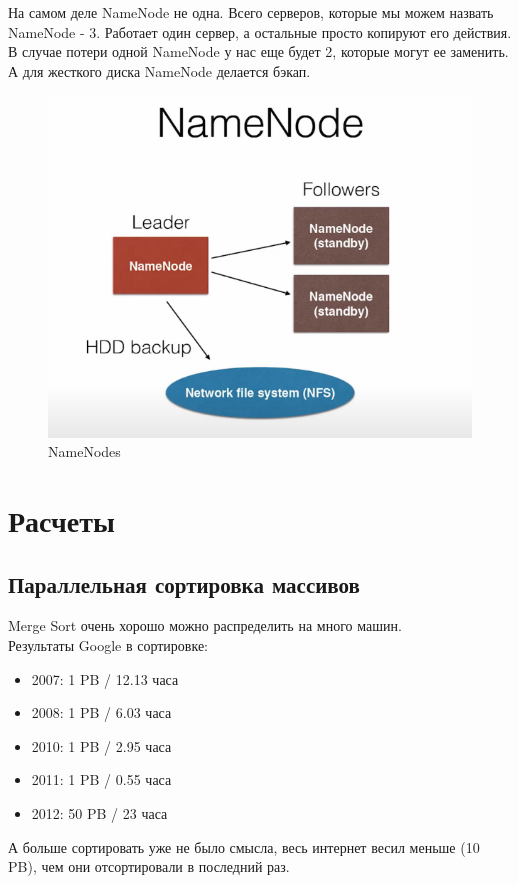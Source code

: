 \documentclass{article}
\begin{document}
На самом деле NameNode не одна. Всего серверов, которые мы можем назвать NameNode - 3. Работает один сервер, а остальные просто копируют его действия. В случае потери одной NameNode у нас еще будет 2, которые могут ее заменить. А для жесткого диска NameNode делается бэкап.

\begin{figure}[h]
\centering
\includegraphics[width=1\textwidth]{NameNode.png}
\caption{NameNodes}
\end{figure}

\section{Расчеты}

\subsection{Параллельная сортировка массивов}

Merge Sort очень хорошо можно распределить на много машин.\\

Результаты Google в сортировке:

\begin{itemize}
    \item 2007: 1 PB / 12.13 часа
    \item 2008: 1 PB / 6.03 часа
    \item 2010: 1 PB / 2.95 часа
    \item 2011: 1 PB / 0.55 часа
    \item 2012: 50 PB / 23 часа
\end{itemize}
А больше сортировать уже не было смысла, весь интернет весил меньше (10 PB), чем они отсортировали в последний раз.
\end{document}
